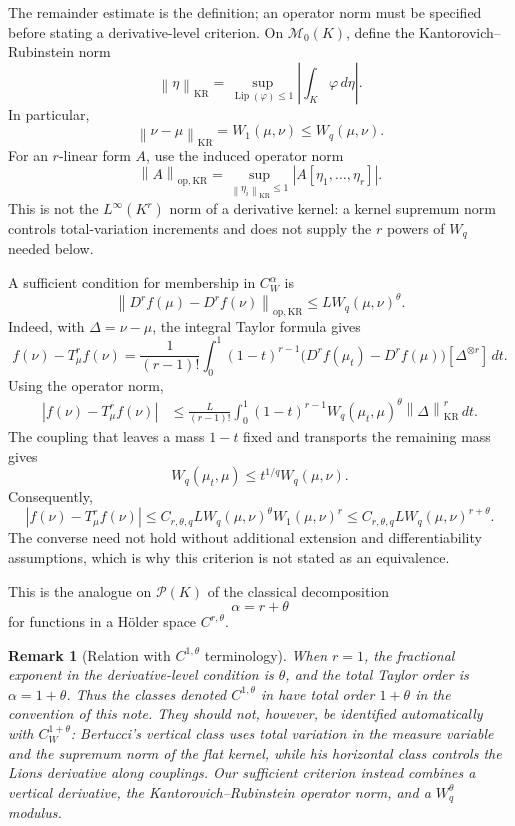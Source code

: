 \documentclass[11pt]{article}
\newtheorem{remark}{Remark}
\newcommand{\Pcal}{\mathcal P}
\newcommand{\Mcal}{\mathcal M}
\newcommand{\norm}[1]{\left\lVert #1\right\rVert}
\begin{document}
The remainder estimate is the definition; an operator norm must be
specified before stating a derivative-level criterion. On
\(\Mcal_0(K)\), define the Kantorovich--Rubinstein norm
\[
\norm{\eta}_{\mathrm{KR}}
=
\sup_{\operatorname{Lip}(\varphi)\leq1}
\left|\int_K\varphi\,d\eta\right|.
\]
In particular,
\[
\norm{\nu-\mu}_{\mathrm{KR}}
=W_1(\mu,\nu)
\leq W_q(\mu,\nu).
\]
For an \(r\)-linear form \(A\), use the induced operator norm
\[
\norm{A}_{\mathrm{op},\mathrm{KR}}
=
\sup_{\norm{\eta_i}_{\mathrm{KR}}\leq1}
\left|A[\eta_1,\ldots,\eta_r]\right|.
\]
This is not the \(L^\infty(K^r)\) norm of a derivative kernel: a kernel
supremum norm controls total-variation increments and does not supply
the \(r\) powers of \(W_q\) needed below.

A sufficient condition for membership in \(C_W^\alpha\) is
\[
\norm{D^rf(\mu)-D^rf(\nu)}_{\mathrm{op},\mathrm{KR}}
\leq
L W_q(\mu,\nu)^\theta.
\]
Indeed, with \(\Delta=\nu-\mu\), the integral Taylor formula gives
\[
f(\nu)-T_\mu^rf(\nu)
=
\frac1{(r-1)!}
\int_0^1(1-t)^{r-1}
\bigl(D^rf(\mu_t)-D^rf(\mu)\bigr)
[\Delta^{\otimes r}]\,dt.
\]
Using the operator norm,
\[
\begin{aligned}
|f(\nu)-T_\mu^rf(\nu)|
&\leq
\frac{L}{(r-1)!}
\int_0^1
(1-t)^{r-1}
W_q(\mu_t,\mu)^\theta
\norm{\Delta}_{\mathrm{KR}}^r\,dt.
\end{aligned}
\]
The coupling that leaves a mass \(1-t\) fixed and transports the
remaining mass gives
\[
W_q(\mu_t,\mu)
\leq t^{1/q}W_q(\mu,\nu).
\]
Consequently,
\[
|f(\nu)-T_\mu^rf(\nu)|
\leq
C_{r,\theta,q}L
W_q(\mu,\nu)^\theta W_1(\mu,\nu)^r
\leq
C_{r,\theta,q}L W_q(\mu,\nu)^{r+\theta}.
\]
The converse need not hold without additional extension and
differentiability assumptions, which is why this criterion is not
stated as an equivalence.

This is the analogue on \(\Pcal(K)\) of the classical decomposition
\[
\alpha=r+\theta
\]
for functions in a Hölder space \(C^{r,\theta}\).

\begin{remark}[Relation with \(C^{1,\theta}\) terminology]
When \(r=1\), the fractional exponent in the derivative-level condition
is \(\theta\), and the total Taylor order is
\(\alpha=1+\theta\). Thus the classes denoted \(C^{1,\theta}\) in
\cite{bertucci} have total order \(1+\theta\) in the convention of this
note. They should not, however, be identified automatically with
\(C_W^{1+\theta}\): Bertucci's vertical class uses total variation in
the measure variable and the supremum norm of the flat kernel, while his
horizontal class controls the Lions derivative along couplings. Our
sufficient criterion instead combines a vertical derivative, the
Kantorovich--Rubinstein operator norm, and a \(W_q^\theta\) modulus.
\end{remark}
\end{document}
